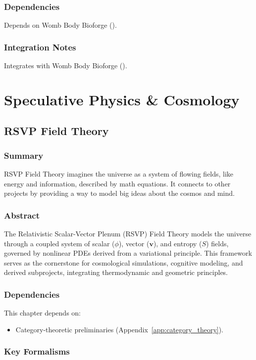 \documentclass[11pt,oneside]{memoir}
\theoremstyle{plain}
\begin{document}
\section{Dependencies}
Depends on Womb Body Bioforge ().

\section{Integration Notes}
Integrates with Womb Body Bioforge ().

\part{Speculative Physics \& Cosmology}
\chapter{RSVP Field Theory}
\label{sec:rsvp_field}
\section{Summary}
RSVP Field Theory imagines the universe as a system of flowing fields, like energy and information, described by math equations. It connects to other projects by providing a way to model big ideas about the cosmos and mind.

\section{Abstract}
The Relativistic Scalar-Vector Plenum (RSVP) Field Theory models the universe through a coupled system of scalar (\(\phi\)), vector (\(\mathbf{v}\)), and entropy (\(S\)) fields, governed by nonlinear PDEs derived from a variational principle. This framework serves as the cornerstone for cosmological simulations, cognitive modeling, and derived subprojects, integrating thermodynamic and geometric principles.

\section{Dependencies}
This chapter depends on:
\begin{itemize}
    \item Category-theoretic preliminaries (Appendix~\ref{app:category_theory}).
\end{itemize}

\section{Key Formalisms}
\end{document}
